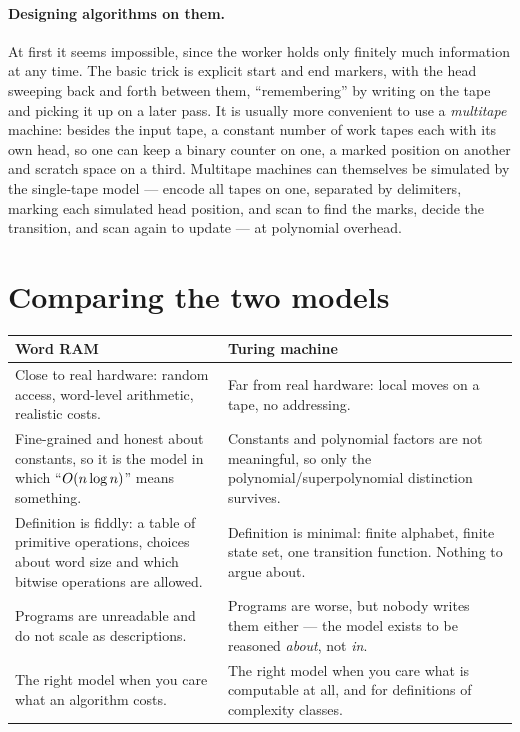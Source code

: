 \paragraph{Designing algorithms on them.}
At first it seems impossible, since the worker holds only finitely much
information at any time. The basic trick is explicit start and end markers,
with the head sweeping back and forth between them, ``remembering'' by writing
on the tape and picking it up on a later pass. It is usually more convenient to
use a \emph{multitape} machine: besides the input tape, a constant number of
work tapes each with its own head, so one can keep a binary counter on one, a
marked position on another and scratch space on a third. Multitape machines can
themselves be simulated by the single-tape model --- encode all tapes on one,
separated by delimiters, marking each simulated head position, and scan to find
the marks, decide the transition, and scan again to update --- at polynomial
overhead.

\section{Comparing the two models}
\label{sec:model-comparison}

\begin{center}
\begin{tabular}{@{}p{}p{}@{}}
\toprule
\textbf{Word RAM} & \textbf{Turing machine} \\
\midrule
Close to real hardware: random access, word-level arithmetic, realistic costs.
& Far from real hardware: local moves on a tape, no addressing. \\[0.6em]
Fine-grained and honest about constants, so it is the model in which
``$O\!\left(n\log n\right)$'' means something.
& Constants and polynomial factors are not meaningful, so only the
polynomial/superpolynomial distinction survives. \\[0.6em]
Definition is fiddly: a table of primitive operations, choices about word size
and which bitwise operations are allowed.
& Definition is minimal: finite alphabet, finite state set, one transition
function. Nothing to argue about. \\[0.6em]
Programs are unreadable and do not scale as descriptions.
& Programs are worse, but nobody writes them either --- the model exists to be
reasoned \emph{about}, not \emph{in}. \\[0.6em]
The right model when you care what an algorithm costs.
& The right model when you care what is computable at all, and for definitions
of complexity classes. \\
\bottomrule
\end{tabular}
\end{center}

